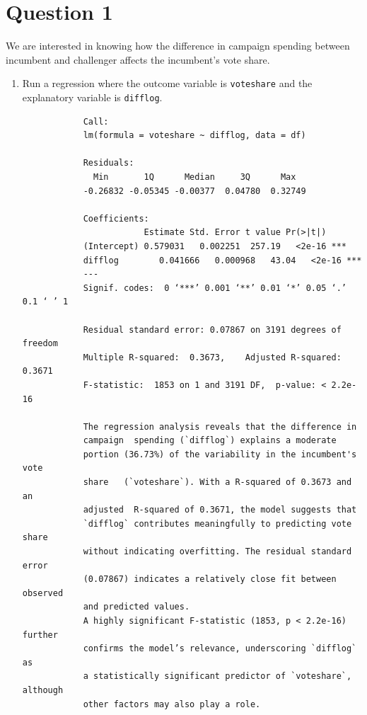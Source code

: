 \documentclass[12pt,letterpaper]{article}
\begin{document}
\section*{Question 1}
\vspace{.25cm}
\noindent We are interested in knowing how the difference in campaign spending between incumbent and challenger affects the incumbent's vote share. 
	\begin{enumerate}
		\item Run a regression where the outcome variable is \texttt{voteshare} and the explanatory variable is \texttt{difflog}.
			  
			\begin{verbatim} 
			Call:
			lm(formula = voteshare ~ difflog, data = df)
			
			Residuals:
			  Min       1Q      Median     3Q      Max 
			-0.26832 -0.05345 -0.00377  0.04780  0.32749 
			
			Coefficients:
			            Estimate Std. Error t value Pr(>|t|)    
			(Intercept) 0.579031   0.002251  257.19   <2e-16 ***
			difflog        0.041666   0.000968   43.04   <2e-16 ***
			---
			Signif. codes:  0 ‘***’ 0.001 ‘**’ 0.01 ‘*’ 0.05 ‘.’ 0.1 ‘ ’ 1
			
			Residual standard error: 0.07867 on 3191 degrees of freedom
			Multiple R-squared:  0.3673,	Adjusted R-squared:  0.3671 
			F-statistic:  1853 on 1 and 3191 DF,  p-value: < 2.2e-16
	 	
			The regression analysis reveals that the difference in 
			campaign  spending (`difflog`) explains a moderate 
			portion (36.73%) of the variability in the incumbent's vote 
			share   (`voteshare`). With a R-squared of 0.3673 and an 
			adjusted  R-squared of 0.3671, the model suggests that 
			`difflog` contributes meaningfully to predicting vote share 
			without indicating overfitting. The residual standard error 
			(0.07867) indicates a relatively close fit between observed 
			and predicted values. 
			A highly significant F-statistic (1853, p < 2.2e-16) further 
			confirms the model’s relevance, underscoring `difflog` as 
			a statistically significant predictor of `voteshare`, although
			other factors may also play a role.
		\end{verbatim}	
		

\end{enumerate}
\end{document}

